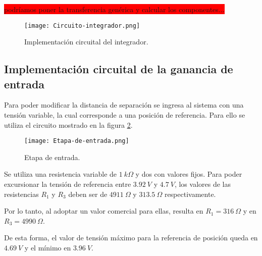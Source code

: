 \colorbox{red}{podríamos poner la transferencia genérica y calcular los componentes...} 

\begin{figure}[H]
	\centering
	\texttt{[image: Circuito-integrador.png]}
	\caption{Implementación circuital del integrador.}
	\label{fig:circuito-integrador}
	\end{figure}


\subsection{Implementación circuital de la ganancia de entrada}


\noindent Para poder modificar la distancia de separación se ingresa al sistema con una tensión variable, la cual corresponde a una posición de referencia. Para ello se utiliza el circuito mostrado en la figura \ref{fig:etapa-de-entrada}.

\begin{figure}[H]
	\centering
	\texttt{[image: Etapa-de-entrada.png]}
	\caption{ Etapa de entrada.}
	\label{fig:etapa-de-entrada}
\end{figure}

 
 \noindent Se utiliza una resistencia variable de $1\:k\Omega$ y dos con valores fijos. Para poder excursionar la tensión de referencia entre $3.92\:V$ y $4.7\:V$, los valores de las resistencias $R_1$ y $R_3$ deben ser de $4911\:\Omega$ y $313.5\:\Omega$ respectivamente. 
 
\noindent Por lo tanto, al adoptar un valor comercial para ellas, resulta en $R_1 = 316 \:\Omega$ y en $R_3 = 4990 \:\Omega$.
 
\noindent De esta forma, el valor de tensión máximo para la referencia de posición queda en $4.69\:V$ y el mínimo en $3.96\:V$.
 
